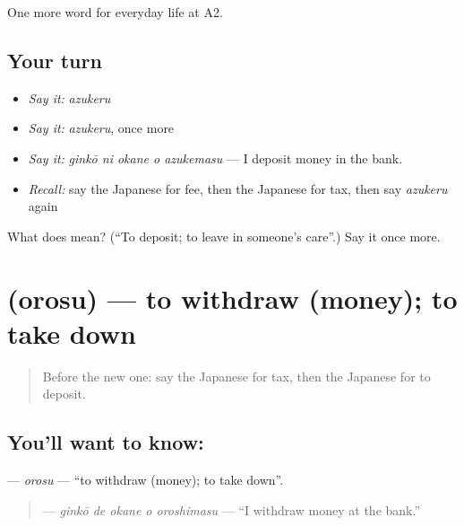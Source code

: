 \begin{grammarlens}[title={What you've built}]
One more word for everyday life at A2.
\end{grammarlens}

\subsection*{Your turn}
\begin{itemize}
\raggedright
  \item \emph{Say it:} \emph{azukeru}
  \item \emph{Say it:} \emph{azukeru}, once more
  \item \emph{Say it:} \emph{ginkō ni okane o azukemasu} — I deposit money in the bank.
  \item \emph{Recall:} say the Japanese for fee, then the Japanese for tax, then say \emph{azukeru} again
\end{itemize}

\begin{tcolorbox}[breakable,colback=teal!4,colframe=teal!35!black,title={Before you move on}]
What does  mean? (\textquotedblleft{}To deposit; to leave in someone's care\textquotedblright{}.) Say it once more.
\end{tcolorbox}
\section[\texorpdfstring{\ja{おろす} (orosu)}{おろす (orosu)}]{ (orosu) — to withdraw (money); to take down}

\label{lesson:JA-C187-orosu}



\begin{quote}
Before the new one: say the Japanese for tax, then the Japanese for to deposit.
\end{quote}

\subsection*{You'll want to know: }
\textbf{} — \emph{orosu} — \textquotedblleft{}to withdraw (money); to take down\textquotedblright{}.

\begin{quote}
\textbf{  } — \emph{ginkō de okane o oroshimasu} — \textquotedblleft{}I withdraw money at the bank.\textquotedblright{}
\end{quote}

